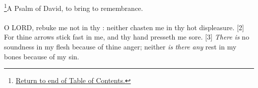 \footnote{\textcolor[rgb]{0.00,0.25,0.00}{\hyperlink{TOC}{Return to end of Table of Contents.}}}\textcolor[cmyk]{0.99998,1,0,0}{A Psalm of David, to bring to remembrance.}\\
\\
\textcolor[cmyk]{0.99998,1,0,0}{O LORD, rebuke me not in thy : neither chasten me in thy hot displeasure.}%
[2] \textcolor[cmyk]{0.99998,1,0,0}{For thine arrows stick fast in me, and thy hand presseth me sore.}
[3] \textcolor[cmyk]{0.99998,1,0,0}{\emph{There} \emph{is} no soundness in my flesh because of thine anger; neither \emph{is} \emph{there} \emph{any} rest in my bones because of my sin.}%
